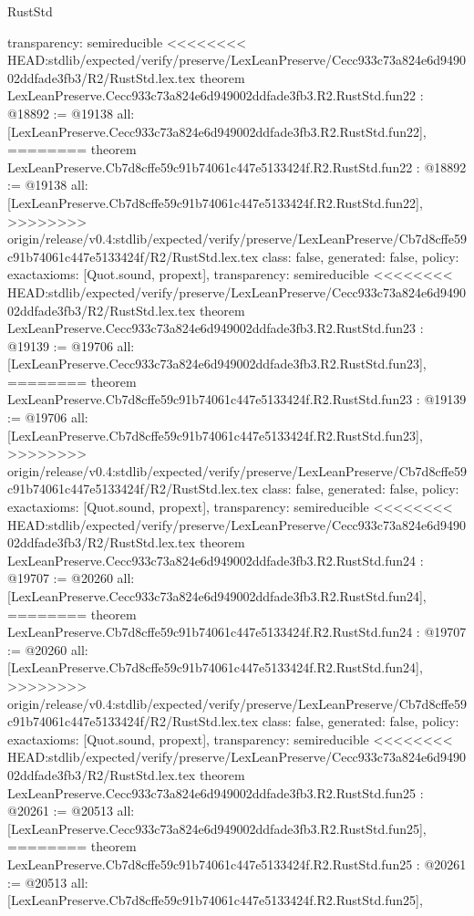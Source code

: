 \begin{lexlean}{RustStd}
\begin{coremodule}
{\begin{coremodule}
{{{{{{{{{{{{{{{{{{{{{{{{{  transparency: semireducible
}
<<<<<<<< HEAD:stdlib/expected/verify/preserve/LexLeanPreserve/Cecc933c73a824e6d949002ddfade3fb3/R2/RustStd.lex.tex
theorem LexLeanPreserve.Cecc933c73a824e6d949002ddfade3fb3.R2.RustStd.fun22 : @18892 := @19138 {
  all: [LexLeanPreserve.Cecc933c73a824e6d949002ddfade3fb3.R2.RustStd.fun22],
========
theorem LexLeanPreserve.Cb7d8cffe59c91b74061c447e5133424f.R2.RustStd.fun22 : @18892 := @19138 {
  all: [LexLeanPreserve.Cb7d8cffe59c91b74061c447e5133424f.R2.RustStd.fun22],
>>>>>>>> origin/release/v0.4:stdlib/expected/verify/preserve/LexLeanPreserve/Cb7d8cffe59c91b74061c447e5133424f/R2/RustStd.lex.tex
  class: false,
  generated: false,
  policy: exact{axioms: [Quot.sound, propext]},
  transparency: semireducible
}
<<<<<<<< HEAD:stdlib/expected/verify/preserve/LexLeanPreserve/Cecc933c73a824e6d949002ddfade3fb3/R2/RustStd.lex.tex
theorem LexLeanPreserve.Cecc933c73a824e6d949002ddfade3fb3.R2.RustStd.fun23 : @19139 := @19706 {
  all: [LexLeanPreserve.Cecc933c73a824e6d949002ddfade3fb3.R2.RustStd.fun23],
========
theorem LexLeanPreserve.Cb7d8cffe59c91b74061c447e5133424f.R2.RustStd.fun23 : @19139 := @19706 {
  all: [LexLeanPreserve.Cb7d8cffe59c91b74061c447e5133424f.R2.RustStd.fun23],
>>>>>>>> origin/release/v0.4:stdlib/expected/verify/preserve/LexLeanPreserve/Cb7d8cffe59c91b74061c447e5133424f/R2/RustStd.lex.tex
  class: false,
  generated: false,
  policy: exact{axioms: [Quot.sound, propext]},
  transparency: semireducible
}
<<<<<<<< HEAD:stdlib/expected/verify/preserve/LexLeanPreserve/Cecc933c73a824e6d949002ddfade3fb3/R2/RustStd.lex.tex
theorem LexLeanPreserve.Cecc933c73a824e6d949002ddfade3fb3.R2.RustStd.fun24 : @19707 := @20260 {
  all: [LexLeanPreserve.Cecc933c73a824e6d949002ddfade3fb3.R2.RustStd.fun24],
========
theorem LexLeanPreserve.Cb7d8cffe59c91b74061c447e5133424f.R2.RustStd.fun24 : @19707 := @20260 {
  all: [LexLeanPreserve.Cb7d8cffe59c91b74061c447e5133424f.R2.RustStd.fun24],
>>>>>>>> origin/release/v0.4:stdlib/expected/verify/preserve/LexLeanPreserve/Cb7d8cffe59c91b74061c447e5133424f/R2/RustStd.lex.tex
  class: false,
  generated: false,
  policy: exact{axioms: [Quot.sound, propext]},
  transparency: semireducible
}
<<<<<<<< HEAD:stdlib/expected/verify/preserve/LexLeanPreserve/Cecc933c73a824e6d949002ddfade3fb3/R2/RustStd.lex.tex
theorem LexLeanPreserve.Cecc933c73a824e6d949002ddfade3fb3.R2.RustStd.fun25 : @20261 := @20513 {
  all: [LexLeanPreserve.Cecc933c73a824e6d949002ddfade3fb3.R2.RustStd.fun25],
========
theorem LexLeanPreserve.Cb7d8cffe59c91b74061c447e5133424f.R2.RustStd.fun25 : @20261 := @20513 {
  all: [LexLeanPreserve.Cb7d8cffe59c91b74061c447e5133424f.R2.RustStd.fun25],
}}}}}}}}}}}}}}}}}}}}}}}}}}}}}
\end{coremodule}}
\end{coremodule}
\end{lexlean}
